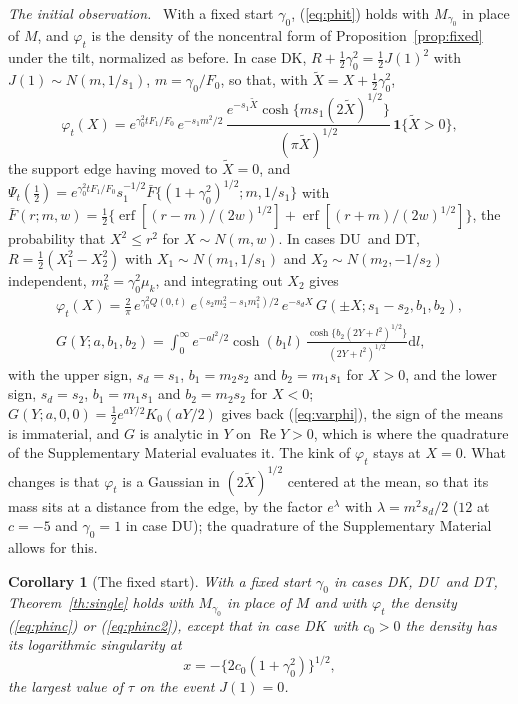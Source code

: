 \documentclass[ecta,nameyear,final]{econsocart}
\newcommand{\dr}[1]{{\mathrm d}#1}
\newcommand{\Rea}{\operatorname{Re}}
\newcommand{\erf}{\operatorname{erf}}
\newcommand{\Fk}{\textsf{\upshape DK}}
\newcommand{\Fu}{\textsf{\upshape DU}}
\newcommand{\Ft}{\textsf{\upshape DT}}
\theoremstyle{plain}
\newtheorem{corollary}{Corollary}
\theoremstyle{definition}
\newcommand{\runin}[1]{\par\medskip\noindent\textit{#1.}\ \ignorespaces}
\begin{document}
\runin{The initial observation}  With a fixed start $\gamma_0$, (\ref{eq:phit}) holds with $M_{\gamma_0}$ in place of $M$, and $\varphi_t$ is the density of the noncentral form of Proposition~\ref{prop:fixed} under the tilt, normalized as before.  In case \Fk, $R+\frac12\gamma_0^2=\frac12J(1)^2$ with $J(1)\sim N(m,1/s_1)$, $m=\gamma_0/F_0$, so that, with $\tilde X=X+\frac12\gamma_0^2$,
\begin{equation}
\varphi_t(X)=e^{\gamma_0^2tF_1/F_0}\,e^{-s_1m^2/2}\,\frac{e^{-s_1\tilde X}\cosh\{ms_1(2\tilde X)^{1/2}\}}{(\pi\tilde X)^{1/2}}\,\mathbf{1}\{\tilde X>0\},
\label{eq:phinc}
\end{equation}
the support edge having moved to $\tilde X=0$, and $\Psi_t(\frac12)=e^{\gamma_0^2tF_1/F_0}s_1^{-1/2}\bar F\{(1+\gamma_0^2)^{1/2};m,1/s_1\}$ with $\bar F(r;m,w)=\frac12\{\erf[(r-m)/(2w)^{1/2}]+\erf[(r+m)/(2w)^{1/2}]\}$, the probability that $X^2\le r^2$ for $X\sim N(m,w)$.  In cases \Fu\ and \Ft, $R=\frac12(X_1^2-X_2^2)$ with $X_1\sim N(m_1,1/s_1)$ and $X_2\sim N(m_2,-1/s_2)$ independent, $m_k^2=\gamma_0^2\mu_k$, and integrating out $X_2$ gives
\begin{equation}
\begin{gathered}
\varphi_t(X)=\frac2\pi\,e^{\gamma_0^2Q(0,t)}\,e^{(s_2m_2^2-s_1m_1^2)/2}\,e^{-s_dX}\,G(\pm X;s_1-s_2,b_1,b_2),\\
G(Y;a,b_1,b_2)=\int_0^\infty e^{-al^2/2}\cosh(b_1l)\,\frac{\cosh\{b_2(2Y+l^2)^{1/2}\}}{(2Y+l^2)^{1/2}}\dr{l},
\end{gathered}
\label{eq:phinc2}
\end{equation}
with the upper sign, $s_d=s_1$, $b_1=m_2s_2$ and $b_2=m_1s_1$ for $X>0$, and the lower sign, $s_d=s_2$, $b_1=m_1s_1$ and $b_2=m_2s_2$ for $X<0$; $G(Y;a,0,0)=\frac12e^{aY/2}K_0(aY/2)$ gives back (\ref{eq:varphi}), the sign of the means is immaterial, and $G$ is analytic in $Y$ on $\Rea Y>0$, which is where the quadrature of the Supplementary Material evaluates it.  The kink of $\varphi_t$ stays at $X=0$.  What changes is that $\varphi_t$ is a Gaussian in $(2\tilde X)^{1/2}$ centered at the mean, so that its mass sits at a distance from the edge, by the factor $e^\lambda$ with $\lambda=m^2s_d/2$ ($12$ at $c=-5$ and $\gamma_0=1$ in case \Fu); the quadrature of the Supplementary Material allows for this.

\begin{corollary}[The fixed start]
\label{cor:fixed}
With a fixed start $\gamma_0$ in cases \Fk, \Fu\ and \Ft, Theorem~\ref{th:single} holds with $M_{\gamma_0}$ in place of $M$ and with $\varphi_t$ the density (\ref{eq:phinc}) or (\ref{eq:phinc2}), except that in case \Fk\ with $c_0>0$ the density has its logarithmic singularity at
\begin{equation*}
x=-\{2c_0(1+\gamma_0^2)\}^{1/2},
\end{equation*}
the largest value of $\tau$ on the event $J(1)=0$.
\end{corollary}
\end{document}
